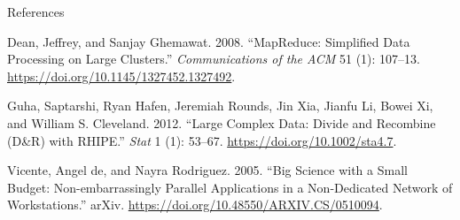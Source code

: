 \documentclass[
  ignorenonframetext,
  usenames,
  dvipsnames]{beamer}
\newlength{\cslhangindent}
\newlength{\cslentryspacingunit} %
\newenvironment{CSLReferences}[2] %
 {%
  \setlength{\parindent}{0pt}
  \ifodd #1
  \let\oldpar\par
  \def\par{\hangindent=\cslhangindent\oldpar}
  \fi
  \setlength{\parskip}{#2\cslentryspacingunit}
 }%
 {}
\begin{document}
\begin{frame}{References}
\hypertarget{refs}{}
\begin{CSLReferences}{1}{0}
\leavevmode{}%
Dean, Jeffrey, and Sanjay Ghemawat. 2008. {``{MapReduce}: Simplified
Data Processing on Large Clusters.''} \emph{Communications of the ACM}
51 (1): 107--13. \url{https://doi.org/10.1145/1327452.1327492}.

\leavevmode{}%
Guha, Saptarshi, Ryan Hafen, Jeremiah Rounds, Jin Xia, Jianfu Li, Bowei
Xi, and William S. Cleveland. 2012. {``Large Complex Data: Divide and
Recombine ({D}\&{R}) with {RHIPE}.''} \emph{Stat} 1 (1): 53--67.
\url{https://doi.org/10.1002/sta4.7}.

\leavevmode{}%
Vicente, Angel de, and Nayra Rodriguez. 2005. {``Big Science with a
Small Budget: {Non-embarrassingly} Parallel Applications in a
Non-Dedicated Network of Workstations.''} {arXiv}.
\url{https://doi.org/10.48550/ARXIV.CS/0510094}.

\end{CSLReferences}
\end{frame}
\end{document}
